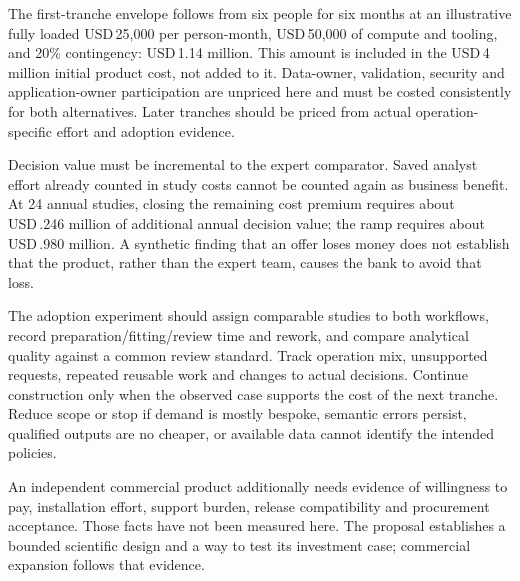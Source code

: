 \documentclass[11pt,a4paper,openany]{book}
\begin{document}
The first-tranche envelope follows from six people for six months at an
illustrative fully loaded USD\,25,000 per person-month, USD\,50,000 of
compute and tooling, and 20\% contingency: USD\,1.14 million. This amount
is included in the USD\,4 million initial product cost, not added to it.
Data-owner, validation, security and application-owner participation
are unpriced here and must be costed consistently for both alternatives.
Later tranches should be priced from actual operation-specific effort and
adoption evidence.

Decision value must be incremental to the expert comparator. Saved analyst
effort already counted in study costs cannot be counted again as business
benefit. At 24 annual studies, closing the remaining cost premium requires
about USD\,.246 million of additional annual decision value; the ramp
requires about USD\,.980 million. A synthetic finding that an offer loses
money does not establish that the product, rather than the expert team,
causes the bank to avoid that loss.

The adoption experiment should assign comparable studies to both workflows,
record preparation/fitting/review time and rework, and compare analytical
quality against a common review standard. Track operation mix, unsupported
requests, repeated reusable work and changes to actual decisions.
Continue construction only when the observed case supports the cost of the
next tranche. Reduce scope or stop if demand is mostly bespoke, semantic
errors persist, qualified outputs are no cheaper, or available data cannot
identify the intended policies.

An independent commercial product additionally needs evidence of willingness
to pay, installation effort, support burden, release compatibility and
procurement acceptance. Those facts have not been measured here. The
proposal establishes a bounded scientific design and a way to test its
investment case; commercial expansion follows that evidence.

\backmatter


\end{document}
